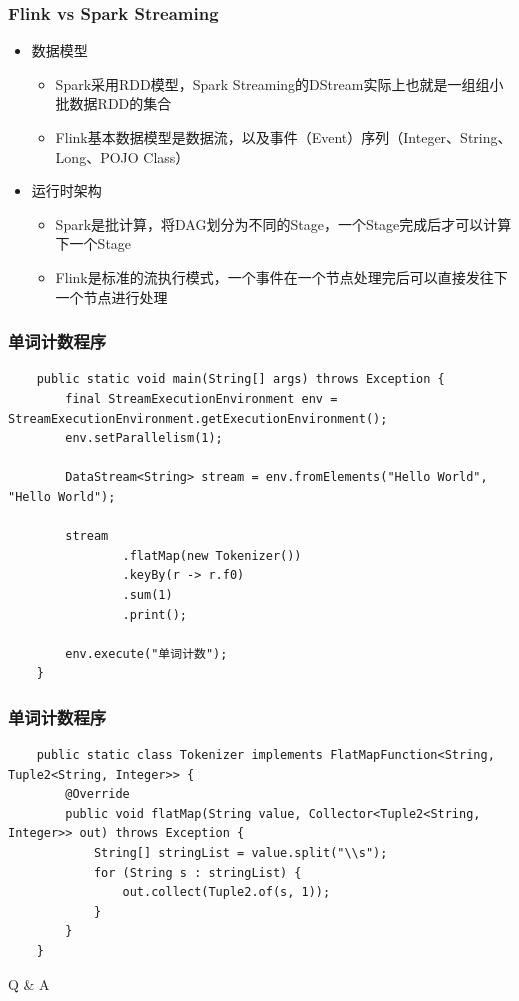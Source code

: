 \documentclass{beamer}
\begin{document}
  \begin{frame}
    \frametitle{Flink vs Spark Streaming}
  
    \begin{itemize}
      \item 数据模型
        \begin{itemize}
          \item Spark采用RDD模型，Spark Streaming的DStream实际上也就是一组组小批数据RDD的集合
          \item Flink基本数据模型是数据流，以及事件（Event）序列（Integer、String、Long、POJO Class）
        \end{itemize}
      \item 运行时架构
        \begin{itemize}
          \item Spark是批计算，将DAG划分为不同的Stage，一个Stage完成后才可以计算下一个Stage
          \item Flink是标准的流执行模式，一个事件在一个节点处理完后可以直接发往下一个节点进行处理
        \end{itemize}
    \end{itemize}
  
  \end{frame}

  \begin{frame}[fragile]
    \frametitle{单词计数程序}
  
    \begin{verbatim}
    public static void main(String[] args) throws Exception {
        final StreamExecutionEnvironment env = StreamExecutionEnvironment.getExecutionEnvironment();
        env.setParallelism(1);

        DataStream<String> stream = env.fromElements("Hello World", "Hello World");

        stream
                .flatMap(new Tokenizer())
                .keyBy(r -> r.f0)
                .sum(1)
                .print();

        env.execute("单词计数");
    }
    \end{verbatim}
  
  \end{frame}

  \begin{frame}[fragile]
    \frametitle{单词计数程序}
  
    \begin{verbatim}
    public static class Tokenizer implements FlatMapFunction<String, Tuple2<String, Integer>> {
        @Override
        public void flatMap(String value, Collector<Tuple2<String, Integer>> out) throws Exception {
            String[] stringList = value.split("\\s");
            for (String s : stringList) {
                out.collect(Tuple2.of(s, 1));
            }
        }
    }
    \end{verbatim}
  
  \end{frame}

  \begin{frame}[plain,c]
    
    \begin{center}
    \Huge Q \& A
    \end{center}
    
  \end{frame}
\end{document}
